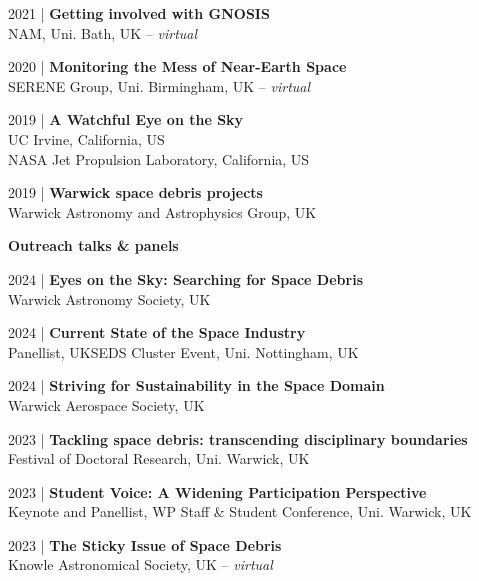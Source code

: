 \documentclass[10pt,a4paper]{altacv}
\begin{document}
\smallskip

\small 2021 | \textbf{Getting involved with GNOSIS} \\
NAM, Uni. Bath, UK -- \textit{virtual}

\smallskip

\small 2020 | \textbf{Monitoring the Mess of Near-Earth Space} \\
SERENE Group, Uni. Birmingham, UK -- \textit{virtual}

\smallskip

\small 2019 | \textbf{A Watchful Eye on the Sky} \\
UC Irvine, California, US \\
NASA Jet Propulsion Laboratory, California, US 

\smallskip

\small 2019 | \textbf{Warwick space debris projects} \\
Warwick Astronomy and Astrophysics Group, UK

\divider

\normalsize \textbf{Outreach talks \& panels}

\medskip

\small 2024 | \textbf{Eyes on the Sky: Searching for Space Debris} \\
Warwick Astronomy Society, UK

\smallskip

\small 2024 | \textbf{Current State of the Space Industry} \\
Panellist, UKSEDS Cluster Event, Uni. Nottingham, UK 

\smallskip

\small 2024 | \textbf{Striving for Sustainability in the Space Domain} \\
Warwick Aerospace Society, UK

\smallskip

\small 2023 | \textbf{Tackling space debris: transcending disciplinary boundaries} \\
Festival of Doctoral Research, Uni. Warwick, UK

\smallskip

\small 2023 | \textbf{Student Voice: A Widening Participation Perspective} \\
Keynote and Panellist, WP Staff \& Student Conference, Uni. Warwick, UK

\smallskip

\small 2023 | \textbf{The Sticky Issue of Space Debris} \\
Knowle Astronomical Society, UK -- \textit{virtual}
\end{document}
